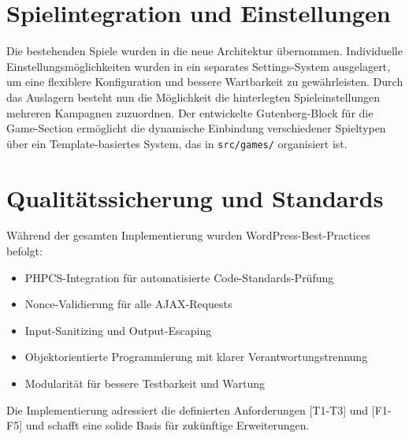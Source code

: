 \section{Spielintegration und Einstellungen}
Die bestehenden Spiele wurden in die neue Architektur übernommen.
Individuelle Einstellungsmöglichkeiten wurden in ein separates Settings-System ausgelagert, um eine flexiblere Konfiguration und bessere Wartbarkeit zu gewährleisten.
Durch das Auslagern besteht nun die Möglichkeit die hinterlegten Spieleinstellungen mehreren Kampagnen zuzuordnen.
Der entwickelte Gutenberg-Block für die Game-Section ermöglicht die dynamische Einbindung verschiedener Spieltypen über ein Template-basiertes System, das in \texttt{src/games/} organisiert ist.

\section{Qualitätssicherung und Standards}
Während der gesamten Implementierung wurden WordPress-Best-Practices befolgt:

\begin{itemize}
    \item PHPCS-Integration für automatisierte Code-Standards-Prüfung
    \item Nonce-Validierung für alle AJAX-Requests
    \item Input-Sanitizing und Output-Escaping
    \item Objektorientierte Programmierung mit klarer Verantwortungstrennung
    \item Modularität für bessere Testbarkeit und Wartung
\end{itemize}

Die Implementierung adressiert die definierten Anforderungen [T1-T3] und [F1-F5] und schafft eine solide Basis für zukünftige Erweiterungen.
